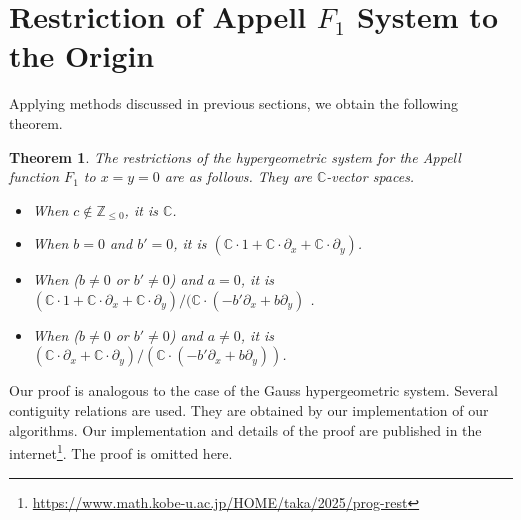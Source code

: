\documentclass{article}
\def\CC{\mathbb{C}}
\def\p{\partial}
\def\aalpha{a}
\def\bbeta{b}
\def\ggamma{c}
\newtheorem{theorem}{Theorem}
\begin{document}
%
\section{Restriction of Appell $F_1$ System to the Origin} \label{sec:f1}

Applying methods discussed in previous sections,
we obtain the following theorem.

\begin{theorem}
The restrictions of the hypergeometric system for the Appell function $F_1$
to $x=y=0$ are as follows.
They are $\CC$-vector spaces.
\begin{itemize}
\item 
When $\ggamma \notin \mathbb{Z}_{\leq 0}$, it is $\mathbb{C}$.

\item 
When $\bbeta = 0$ and $\bbeta' = 0$,
it is
$(\mathbb{C} \cdot 1 + \mathbb{C} \cdot \p_x + \mathbb{C} \cdot \p_y)$.

\item 
When ($\bbeta \neq 0$ or $\bbeta' \neq 0$) and $\aalpha = 0$,
it is
$(\mathbb{C} \cdot 1 + \mathbb{C} \cdot \p_x + \mathbb{C} \cdot \p_y)
/(\mathbb{C} \cdot (-\bbeta' \p_x + \bbeta \p_y)$ .

\item 
When ($\bbeta \neq 0$ or $\bbeta' \neq 0$) and $\aalpha \neq 0$,
it is
$(\mathbb{C} \cdot \p_x + \mathbb{C} \cdot \p_y)/
(\mathbb{C} \cdot (-\bbeta' \p_x + \bbeta \p_y))$.
\end{itemize}
\end{theorem}

Our proof is analogous to the case of the Gauss hypergeometric system.
Several contiguity relations are used.
They are obtained by our implementation
of our algorithms.
Our implementation and details of the proof are published 
in the internet\footnote{ 
\url{https://www.math.kobe-u.ac.jp/HOME/taka/2025/prog-rest}}.
The proof is omitted here.
%




%
\fi
\end{document}
